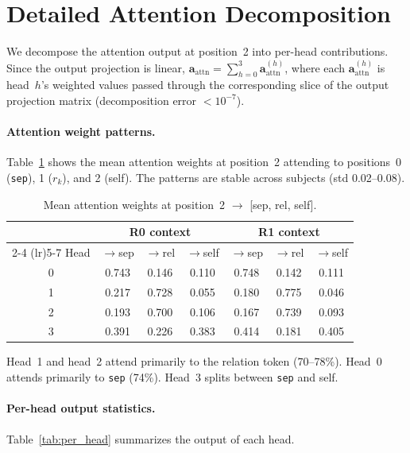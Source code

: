 \documentclass[11pt,a4paper]{article}
\newcommand{\attnout}{\mathbf{a}_{\mathrm{attn}}}
\begin{document}
\appendix
\section{Detailed Attention Decomposition}
\label{app:attention}

We decompose the attention output at position~2 into per-head
contributions. Since the output projection is linear, $\attnout =
\sum_{h=0}^{3} \attnout^{(h)}$, where each $\attnout^{(h)}$ is
head~$h$'s weighted values passed through the corresponding slice of
the output projection matrix (decomposition error $< 10^{-7}$).

\paragraph{Attention weight patterns.}
Table~\ref{tab:attn_weights} shows the mean attention weights at
position~2 attending to positions~0 (\texttt{sep}), 1 ($r_k$), and 2
(self). The patterns are stable across subjects (std 0.02--0.08).

\begin{table}[h]
\centering
\caption{Mean attention weights at position~2 $\to$ [sep, rel, self].}
\label{tab:attn_weights}
\begin{tabular}{ccccccc}
\toprule
& \multicolumn{3}{c}{R0 context} & \multicolumn{3}{c}{R1 context} \\
\cmidrule(lr){2-4} \cmidrule(lr){5-7}
Head & $\to$sep & $\to$rel & $\to$self & $\to$sep & $\to$rel & $\to$self \\
\midrule
0 & 0.743 & 0.146 & 0.110 & 0.748 & 0.142 & 0.111 \\
1 & 0.217 & 0.728 & 0.055 & 0.180 & 0.775 & 0.046 \\
2 & 0.193 & 0.700 & 0.106 & 0.167 & 0.739 & 0.093 \\
3 & 0.391 & 0.226 & 0.383 & 0.414 & 0.181 & 0.405 \\
\bottomrule
\end{tabular}
\end{table}

Head~1 and head~2 attend primarily to the relation token (70--78\%).
Head~0 attends primarily to \texttt{sep} (74\%). Head~3 splits between
\texttt{sep} and self.

\paragraph{Per-head output statistics.}
Table~\ref{tab:per_head} summarizes the output of each head.
\end{document}
